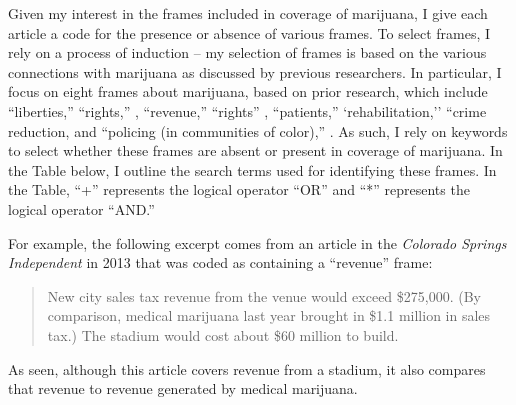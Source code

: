 

Given my interest in the frames included in coverage of marijuana, I give each article a code for the presence or absence of various frames. To select frames, I rely on a process of induction -- my selection of frames is based on the various connections with marijuana as discussed by previous researchers. In particular, I focus on eight frames about marijuana, based on prior research, which include ``liberties,'' ``rights,'' \citep{rosenthal_and_kubby_1996}, ``revenue,'' ``rights'' \citep{caulkins_et_al_2012,miron_2010}, ``patients,'' `rehabilitation,'' ``crime reduction, and ``policing (in communities of color),'' \citep{newhart_and_dolphin_2018,mosher_and_akins_2019,alexander_2010}. As such, I rely on keywords to select whether these frames are absent or present in coverage of marijuana. In the Table below, I outline the search terms used for identifying these frames. In the Table, ``+'' represents the logical operator ``OR'' and ``*'' represents the logical operator ``AND.''



For example, the following excerpt comes from an article in the \textit{Colorado Springs Independent} in 2013 that was coded as containing a ``revenue'' frame:

\begin{quote}
New city sales tax revenue from the venue would exceed \$275,000. (By comparison, medical marijuana last year brought in \$1.1 million in sales tax.) The stadium would cost about \$60 million to build.
\end{quote}

As seen, although this article covers revenue from a stadium, it also compares that revenue to revenue generated by medical marijuana. 


